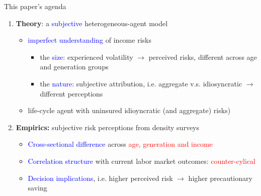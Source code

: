 \documentclass{beamer}
\begin{document}
\begin{frame}{This paper's agenda}
	\begin{enumerate}
			\item \textbf{Theory}: a \textcolor{blue}{subjective} heterogeneous-agent model 
		\begin{itemize}
			\item  \textcolor{blue}{imperfect understanding} of income risks
			\begin{itemize}
				\item the \textcolor{blue}{size:} experienced volatility $\rightarrow$  perceived risks, different across age and generation groups
				\item the \textcolor{blue}{nature:} subjective attribution, i.e.  aggregate v.s. idiosyncratic  $\rightarrow$ different perceptions
			\end{itemize}
			\item life-cycle agent with uninsured idioyncratic (and aggregate) risks)
		\end{itemize} 
		\item \textbf{Empirics:} subjective risk perceptions from density surveys
		\begin{itemize}
			\item \textcolor{blue}{Cross-sectional difference} across \textcolor{red}{age, generation and income} 
			\item \textcolor{blue}{Correlation structure} with current labor market outcomes: \textcolor{red}{counter-cylical} 
			\item \textcolor{blue}{Decision implications}, i.e. higher perceived risk $\rightarrow$ higher precautionary saving 
		\end{itemize}
	
	\end{enumerate}
\end{frame}
\end{document}
